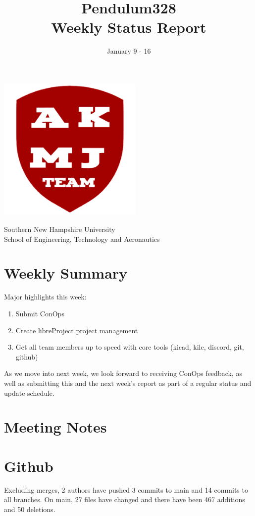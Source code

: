 \documentclass{article}
\title{Pendulum328\\[1ex] \large Weekly Status Report}
\date{January 9 - 16}
\begin{document}
\maketitle

\begin{center}
    \includegraphics[height=7cm]{../../Media/AJMK_Logo.png}

    \vspace{0.8cm}

    Southern New Hampshire University\\
    School of Engineering, Technology and Aeronautics
\end{center}

\pagebreak


\section{Weekly Summary}

Major highlights this week:

\begin{enumerate}
 \item Submit ConOps
 \item Create libreProject project management
 \item Get all team members up to speed with core tools (kicad, kile, discord, git, github)
\end{enumerate}

As we move into next week, we look forward to receiving ConOps feedback, as well
as submitting this and the next week's report as part of a regular status and
update schedule.


\section{Meeting Notes}


\section{Github}

Excluding merges, 2 authors have pushed 3 commits to main and 14 commits to all branches. On main, 27 files have changed and there have been 467 additions and 50 deletions.
\end{document}
